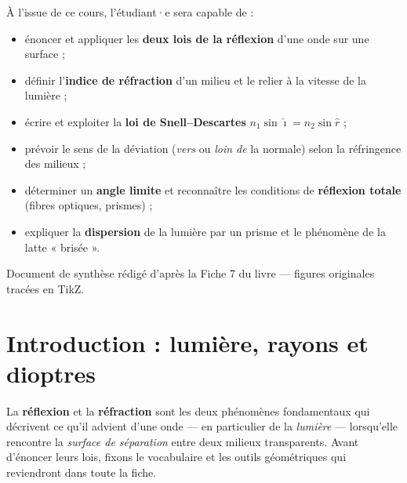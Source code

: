 \documentclass[11pt,a4paper]{article}
\newcommand{\angi}{\hat{\imath}}     %
\newcommand{\angr}{\hat{r}}          %
\begin{document}
\begin{tcolorbox}[boxbase,colback=primary!5,colframe=primary,width=15cm,
    title={\textsc{Objectifs pédagogiques de la fiche}}]
À l'issue de ce cours, l'étudiant·e sera capable de :
\begin{itemize}[leftmargin=1.6em,topsep=2pt,itemsep=1pt]
  \item énoncer et appliquer les \textbf{deux lois de la réflexion} d'une onde sur une surface ;
  \item définir l'\textbf{indice de réfraction} d'un milieu et le relier à la vitesse de la lumière ;
  \item écrire et exploiter la \textbf{loi de Snell–Descartes} $n_1\sin\angi = n_2\sin\angr$ ;
  \item prévoir le sens de la déviation (\emph{vers} ou \emph{loin de} la normale) selon la réfringence des milieux ;
  \item déterminer un \textbf{angle limite} et reconnaître les conditions de \textbf{réflexion totale} (fibres optiques, prismes) ;
  \item expliquer la \textbf{dispersion} de la lumière par un prisme et le phénomène de la latte « brisée ».
\end{itemize}
\end{tcolorbox}

\vspace{0.5cm}
{\small\color{black!60} Document de synthèse rédigé d'après la Fiche 7 du livre — figures originales tracées en TikZ.}
\par
\endgroup

\newpage
\renewcommand{\contentsname}{\textcolor{primarydark}{Table des matières}}
\tableofcontents
\thispagestyle{fancy}
\newpage

\section{Introduction : lumière, rayons et dioptres}
La \textbf{réflexion} et la \textbf{réfraction} sont les deux phénomènes fondamentaux qui décrivent
ce qu'il advient d'une onde — en particulier de la \emph{lumière} — lorsqu'elle rencontre la
\emph{surface de séparation} entre deux milieux transparents. Avant d'énoncer leurs lois, fixons
le vocabulaire et les outils géométriques qui reviendront dans toute la fiche.
\end{document}
